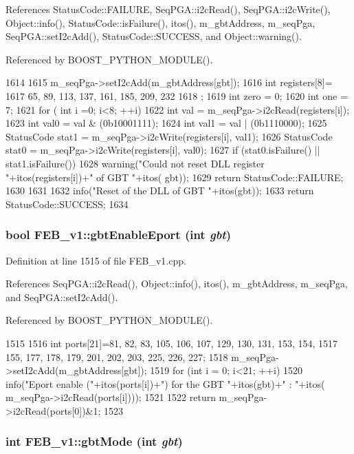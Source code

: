 References StatusCode::FAILURE, SeqPGA::i2cRead(), SeqPGA::i2cWrite(), Object::info(), StatusCode::isFailure(), itos(), m\_\-gbtAddress, m\_\-seqPga, SeqPGA::setI2cAdd(), StatusCode::SUCCESS, and Object::warning().

Referenced by BOOST\_\-PYTHON\_\-MODULE().


\begin{DoxyCode}
1614                                      {
1615   m_seqPga->setI2cAdd(m_gbtAddress[gbt]);
1616   int registers[8]={
1617     65, 89, 113, 137, 161, 185, 209, 232
1618   };
1619   int zero = 0;
1620   int one  = 7;
1621   for ( int i =0; i<8; ++i){
1622     int val  = m_seqPga->i2cRead(registers[i]);
1623     int val0 = val & (0b10001111);
1624     int val1 = val | (0b1110000);
1625     StatusCode stat1 = m_seqPga->i2cWrite(registers[i], val1);
1626     StatusCode stat0 = m_seqPga->i2cWrite(registers[i], val0);
1627     if (stat0.isFailure() || stat1.isFailure()){
1628       warning("Could not reset DLL register "+itos(registers[i])+" of GBT "+itos(
      gbt));
1629       return StatusCode::FAILURE;
1630     }
1631   }
1632   info("Reset of the DLL of GBT "+itos(gbt));
1633   return StatusCode::SUCCESS;
1634 }
\end{DoxyCode}
\hypertarget{classFEB__v1_ae11c18013b56bdbb947e9ae147d6d77d}{
\subsubsection[{gbtEnableEport}]{\setlength{\rightskip}{0pt plus 5cm}bool FEB\_\-v1::gbtEnableEport (int {\em gbt})}}
\label{classFEB__v1_ae11c18013b56bdbb947e9ae147d6d77d}


Definition at line 1515 of file FEB\_\-v1.cpp.

References SeqPGA::i2cRead(), Object::info(), itos(), m\_\-gbtAddress, m\_\-seqPga, and SeqPGA::setI2cAdd().

Referenced by BOOST\_\-PYTHON\_\-MODULE().


\begin{DoxyCode}
1515                                     {
1516   int ports[21]={81, 82, 83, 105, 106, 107, 129, 130, 131, 153, 154,
1517          155, 177, 178, 179, 201, 202, 203, 225, 226, 227};
1518   m_seqPga->setI2cAdd(m_gbtAddress[gbt]);
1519   for (int i = 0; i<21; ++i){
1520     info("Eport enable ("+itos(ports[i])+") for the GBT "+itos(gbt)+" : "+itos(
      m_seqPga->i2cRead(ports[i])));
1521   }
1522   return m_seqPga->i2cRead(ports[0])&1;
1523 }
\end{DoxyCode}
\hypertarget{classFEB__v1_aab7166214ef0f99f4835ce9a7416e052}{
\subsubsection[{gbtMode}]{\setlength{\rightskip}{0pt plus 5cm}int FEB\_\-v1::gbtMode (int {\em gbt})}}
\label{classFEB__v1_aab7166214ef0f99f4835ce9a7416e052}


